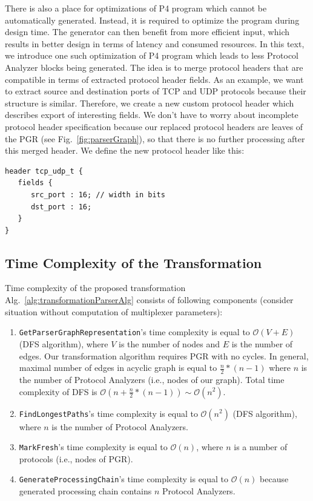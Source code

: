 There is also a place for optimizations of P4 program which cannot be automatically generated. 
Instead, it is required to optimize the program during design time.
The generator can then benefit from more efficient input, which results in better design in terms of latency and consumed resources. 
In this text, we introduce one such optimization 
of P4 program which leads to less Protocol Analyzer blocks being generated.
The idea is to merge protocol headers that are compatible in terms of extracted protocol header fields.
As an example, we want to extract source and destination ports of TCP and UDP protocols because their structure is similar. 
Therefore, we create a new custom protocol header which describes export of interesting fields.  
We don't have to worry about incomplete protocol header specification because our replaced protocol headers are 
leaves of the PGR (see Fig.~\ref{fig:parserGraph}), so that there is no further processing after this merged header.
We define the new protocol header like this:
\begin{Verbatim}[fontsize=\small]
header tcp_udp_t {
   fields {
      src_port : 16; // width in bits
      dst_port : 16;
   }
}
\end{Verbatim}

\subsection{Time Complexity of the Transformation}
\label{sec:parserTimeComplexity}

Time complexity of the proposed transformation Alg.~\ref{alg:transformationParserAlg} consists of following components (consider situation
without computation of multiplexer parameters):
\begin{enumerate}
    \item \texttt{GetParserGraphRepresentation}'s time complexity is equal to $\mathcal{O}(V+E)$ (DFS algorithm), where $V$ is the number of nodes and 
$E$ is the number of edges. Our transformation algorithm requires PGR with no cycles.
In general, maximal number of edges in acyclic graph is equal to $\frac{n}{2}*(n-1)$ where $n$ is the number of Protocol Analyzers 
(i.e., nodes of our graph). Total time complexity of DFS is $\mathcal{O}(n+\frac{n}{2}*(n-1)) \sim \mathcal{O}(n^2)$.
    \item \texttt{FindLongestPaths}'s time complexity is equal to $\mathcal{O}(n^2)$ (DFS algorithm), where $n$ is the number of Protocol Analyzers.
    \item \texttt{MarkFresh}'s time complexity is equal to $\mathcal{O}(n)$, where $n$ is a number of protocols (i.e., nodes of PGR).
    \item \texttt{GenerateProcessingChain}'s time complexity is equal to $\mathcal{O}(n)$ because generated processing chain contains $n$ 
    Protocol Analyzers. 
\end{enumerate}

